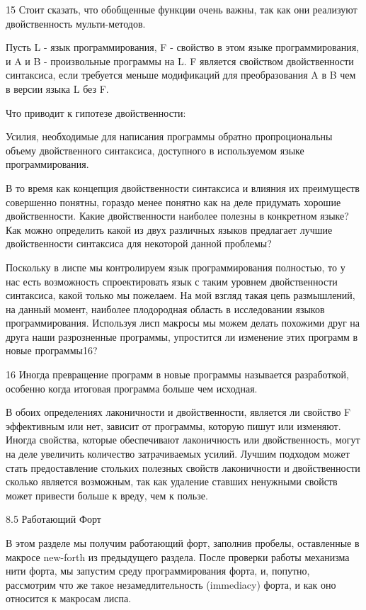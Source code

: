 15 Стоит сказать, что обобщенные функции очень важны, так как они реализуют двойственность мульти-методов.

Пусть L - язык программирования, F - свойство в этом языке программирования, и A и B - произвольные программы на L. F является свойством двойственности синтаксиса, если требуется меньше модификаций для преобразования A в B чем в версии языка L без F.

Что приводит к гипотезе двойственности:

Усилия, необходимые для написания программы обратно пропроциональны объему двойственного синтаксиса, доступного в используемом языке программирования.

В то время как концепция двойственности синтаксиса и влияния их преимуществ совершенно понятны, гораздо менее понятно как на деле придумать хорошие двойственности. Какие двойственности наиболее полезны в конкретном языке? Как можно определить какой из двух различных языков предлагает лучшие двойственности синтаксиса для некоторой данной проблемы?

Поскольку в лиспе мы контролируем язык программирования полностью, то у нас есть возможность спроектировать язык с таким уровнем двойственности синтаксиса, какой только мы пожелаем. На мой взгляд такая цепь размышлений, на данный момент, наиболее плодородная область в исследовании языков программирования. Используя лисп макросы мы можем делать похожими друг на друга наши разрозненные программы, упростится ли изменение этих программ в новые программы16?

16 Иногда превращение программ в новые программы называется разработкой, особенно когда итоговая программа больше чем исходная.

В обоих определениях лаконичности и двойственности, является ли свойство F эффективным или нет, зависит от программы, которую пишут или изменяют. Иногда свойства, которые обеспечивают лаконичность или двойственность, могут на деле увеличить количество затрачиваемых усилий. Лучшим подходом может стать предоставление стольких полезных свойств лаконичности и двойственности сколько является возможным, так как удаление ставших ненужными свойств может привести больше к вреду, чем к пользе.

8.5 Работающий Форт

В этом разделе мы получим работающий форт, заполнив пробелы, оставленные в макросе new-forth из предыдущего раздела. После проверки работы механизма нити форта, мы запустим среду программирования форта, и, попутно, рассмотрим что же такое незамедлительность (immediacy) форта, и как оно относится к макросам лиспа.

